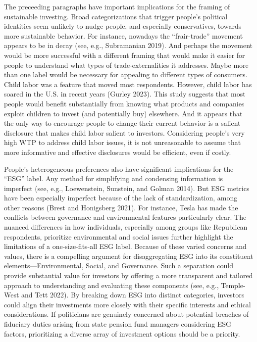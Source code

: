 \documentclass[
  12pt,
]{article}
\begin{document}
The preceeding paragraphs have important implications for the framing of sustainable investing. Broad categorizations that trigger people's political identities seem unlikely to nudge people, and especially conservatives, towards more sustainable behavior. For instance, nowadays the ``frair-trade'' movement appears to be in decay (see, e.g., Subramanian 2019). And perhaps the movement would be more successful with a different framing that would make it easier for people to understand what types of trade-externalities it addresses. Maybe more than one label would be necessary for appealing to different types of consumers. Child labor was a feature that moved most respondents. However, child labor has soared in the U.S. in recent years (Gurley 2023). This study suggests that most people would benefit substantially from knowing what products and companies exploit children to invest (and potentially buy) elsewhere. And it appears that the only way to encourage people to change their current behavior is a salient disclosure that makes child labor salient to investors. Considering people's very high WTP to address child labor issues, it is not unreasonable to assume that more informative and effective disclosures would be efficient, even if costly.

People's heterogeneous preferences also have significant implications for the ``ESG'' label. Any method for simplifying and condensing information is imperfect (see, e.g., Loewenstein, Sunstein, and Golman 2014). But ESG metrics have been especially imperfect because of the lack of standardization, among other reasons (Brest and Honigsberg 2021). For instance, Tesla has made the conflicts between governance and environmental features particularly clear. The nuanced differences in how individuals, especially among groups like Republican respondents, prioritize environmental and social issues further highlight the limitations of a one-size-fits-all ESG label. Because of these varied concerns and values, there is a compelling argument for disaggregating ESG into its constituent elements---Environmental, Social, and Governance. Such a separation could provide substantial value for investors by offering a more transparent and tailored approach to understanding and evaluating these components (see, e.g., Temple-West and Tett 2022). By breaking down ESG into distinct categories, investors could align their investments more closely with their specific interests and ethical considerations. If politicians are genuinely concerned about potential breaches of fiduciary duties arising from state pension fund managers considering ESG factors, prioritizing a diverse array of investment options should be a priority.
\end{document}
